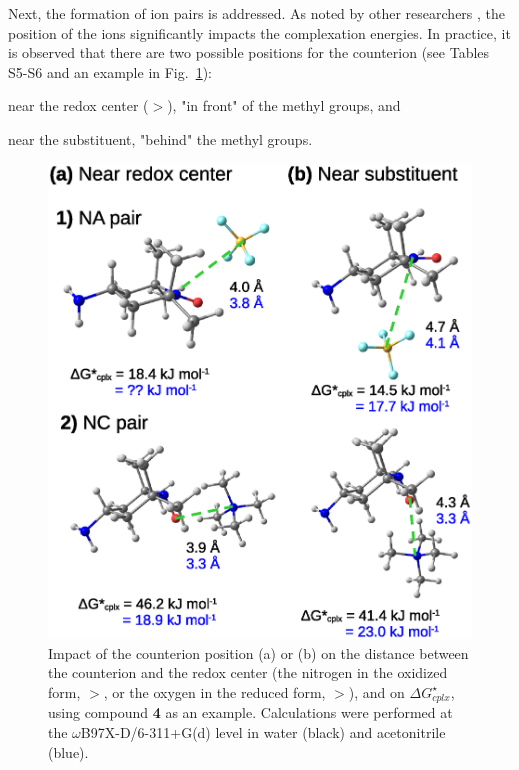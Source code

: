 \documentclass[review,preprint]{elsarticle}
\begin{document}
\clearpage

Next, the formation of ion pairs is addressed. As noted by other researchers \cite{zhangInteractionsImidazoliumBasedIonic2016,wylieImprovedPerformanceAllOrganic2019a}, the position of the ions significantly impacts the complexation energies. In practice, it is observed that there are two possible positions for the counterion (see Tables S5-S6 and an example in Fig.~\ref{fig:pos-anion}):
\begin{inparaenum}[(i)]
	\item near the redox center ($>$), "in front" of the methyl groups, and
	\item near the substituent, "behind" the methyl groups.
\end{inparaenum}

\begin{figure}[!h]
\centering
\includegraphics[width=.8\linewidth]{Figure12}
\caption{Impact of the counterion position (a) or (b) on the distance between the counterion and the redox center (the nitrogen in the oxidized form, $>$, or the oxygen in the reduced form, $>$), and on $\Delta G^\star_{cplx}$, using compound \textbf{4} as an example. Calculations were performed at the $\omega$B97X-D/6-311+G(d) level in water (black) and acetonitrile (blue).}
\label{fig:pos-anion}
\end{figure}
\end{document}

